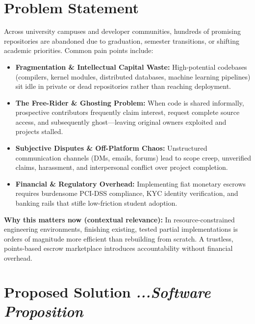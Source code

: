 \documentclass[11pt,a4paper]{article}
\begin{document}
\section{Problem Statement}
Across university campuses and developer communities, hundreds of promising repositories are abandoned due to graduation, semester transitions, or shifting academic priorities. Common pain points include:
\begin{itemize}
    \item \textbf{Fragmentation \& Intellectual Capital Waste:} High-potential codebases (compilers, kernel modules, distributed databases, machine learning pipelines) sit idle in private or dead repositories rather than reaching deployment.
    \item \textbf{The Free-Rider \& Ghosting Problem:} When code is shared informally, prospective contributors frequently claim interest, request complete source access, and subsequently ghost---leaving original owners exploited and projects stalled.
    \item \textbf{Subjective Disputes \& Off-Platform Chaos:} Unstructured communication channels (DMs, emails, forums) lead to scope creep, unverified claims, harassment, and interpersonal conflict over project completion.
    \item \textbf{Financial \& Regulatory Overhead:} Implementing fiat monetary escrows requires burdensome PCI-DSS compliance, KYC identity verification, and banking rails that stifle low-friction student adoption.
\end{itemize}
\textbf{Why this matters now (contextual relevance):} In resource-constrained engineering environments, finishing existing, tested partial implementations is orders of magnitude more efficient than rebuilding from scratch. A trustless, points-based escrow marketplace introduces accountability without financial overhead.

\section{Proposed Solution \hfill \normalfont\small\textit{...Software Proposition}}
\end{document}
